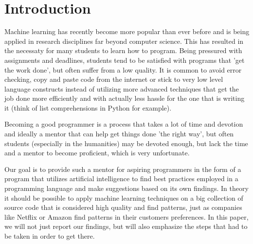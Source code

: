 \section{Introduction}
\label{sec:introduction}

  Machine learning has recently become more popular than ever before
  and is being applied in research disciplines far beyond computer
  science. This has resulted in the necessaty for many students to learn
  how to program. Being pressured with assignments and deadlines, students
  tend to be satisfied with programs that 'get the work done', but often
  suffer from a low quality. It is common to avoid error checking, copy
  and paste code from the internet or stick to very low level language
  constructs instead of utilizing more advanced techniques that get the
  job done more efficiently and with actually less hassle for the one
  that is writing it (think of list comprehensions in Python for example).

  Becoming a good programmer is a process that takes a lot of time
  and devotion and ideally a mentor that can help get things done 'the
  right way', but often students (especially in the humanities) may be
  devoted enough, but lack the time and a mentor to become proficient,
  which is very unfortunate.

  Our goal is to provide such a mentor for aspiring programmers in the form
  of a program that utilizes artificial intelligence to find best practices
  employed in a programming language and make suggestions based on its
  own findings. In theory it should be possible to apply machine learning techniques
  on a big collection of source code that is considered high quality and
  find patterns, just as companies like Netflix or Amazon find patterns in their customers
  preferences. In this paper, we will not just report our findings, but will also
  emphasize the steps that had to be taken in order to get there.
